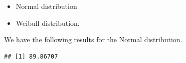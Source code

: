 \documentclass[
]{article}
\newenvironment{Shaded}{\begin{snugshade}}{\end{snugshade}}
\newcommand{\CommentTok}[1]{\textcolor[rgb]{0.56,0.35,0.01}{\textit{#1}}}
\newcommand{\DecValTok}[1]{\textcolor[rgb]{0.00,0.00,0.81}{#1}}
\newcommand{\FunctionTok}[1]{\textcolor[rgb]{0.00,0.00,0.00}{#1}}
\newcommand{\NormalTok}[1]{#1}
\newcommand{\OtherTok}[1]{\textcolor[rgb]{0.56,0.35,0.01}{#1}}
\newcommand{\SpecialCharTok}[1]{\textcolor[rgb]{0.00,0.00,0.00}{#1}}
\newcommand{\StringTok}[1]{\textcolor[rgb]{0.31,0.60,0.02}{#1}}
\providecommand{\tightlist}{%
  \setlength{\itemsep}{0pt}\setlength{\parskip}{0pt}}
\begin{document}
\begin{itemize}
\tightlist
\item
  Normal distribution
\item
  Weibull distribution.
\end{itemize}

We have the following results for the Normal distribution.

\begin{Shaded}
\end{Shaded}

\begin{verbatim}
## [1] 89.86707
\end{verbatim}
\end{document}
